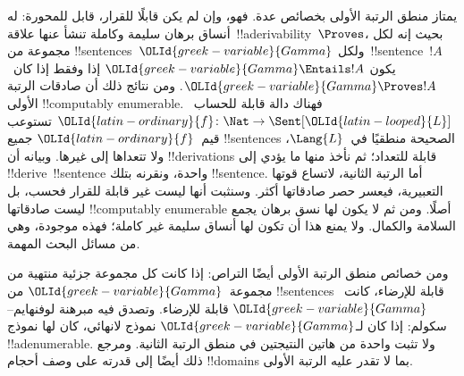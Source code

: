 \documentclass[../../../include/open-logic-section]{subfiles}
\begin{document}


يمتاز منطق الرتبة الأولى بخصائص عدة. فهو، وإن لم يكن قابلًا للقرار،
قابل للمحورة: له أنساق برهان سليمة وكاملة تنشأ عنها
علاقة~!!a{derivability}~$\Proves$، بحيث إنه لكل مجموعة من
!!{sentence}s~$\OLId{greek-variable}{Gamma}$ ولكل~!!{sentence}~$!A$ يكون
$\OLId{greek-variable}{Gamma} \Entails !A$ إذا وفقط إذا كان~$\OLId{greek-variable}{Gamma} \Proves !A$.
ومن نتائج ذلك أن صادقات الرتبة الأولى !!{computably
  enumerable}. فهناك دالة قابلة للحساب~$\OLId{latin-ordinary}{f}\colon \Nat \to
\Sent[\OLId{latin-looped}{L}]$ تستوعب قيم~$\OLId{latin-ordinary}{f}$ جميع !!{sentence}s الصحيحة منطقيًا
في~$\Lang{L}$، ولا تتعداها إلى غيرها.
وبيانه أن !!{derivation}s قابلة للتعداد؛ ثم نأخذ منها ما
يؤدي إلى !!{derive}~!!{sentence} واحدة، ونقرنه بتلك
!!{sentence}. أما الرتبة الثانية، لاتساع قوتها التعبيرية،
فيعسر حصر صادقاتها أكثر. وسنثبت أنها ليست غير قابلة للقرار
فحسب، بل ليست صادقاتها !!{computably
  enumerable} أصلًا. ومن ثم لا يكون لها نسق برهان يجمع
السلامة والكمال. ولا يمنع هذا أن تكون لها أنساق سليمة غير كاملة؛
فهذه موجودة، وهي من مسائل البحث المهمة.

ومن خصائص منطق الرتبة الأولى أيضًا التراص: إذا كانت كل مجموعة
جزئية منتهية من مجموعة~$\OLId{greek-variable}{Gamma}$ من !!{sentence}s قابلة للإرضاء،
كانت~$\OLId{greek-variable}{Gamma}$ قابلة للإرضاء. وتصدق فيه مبرهنة لوفنهايم--سكولم:
إذا كان لـ$\OLId{greek-variable}{Gamma}$ نموذج لانهائي، كان لها نموذج !!a{denumerable}.
ولا تثبت واحدة من هاتين النتيجتين في منطق الرتبة الثانية.
ومرجع ذلك أيضًا إلى قدرته على وصف أحجام !!{domain}s
بما لا تقدر عليه الرتبة الأولى.
\end{document}
